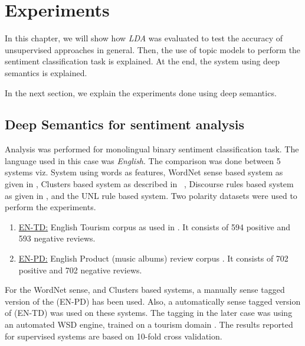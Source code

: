 \chapter{Experiments} %

\label{experiments} %




In this chapter, we will show how \textit{LDA} was evaluated to test the accuracy of unsupervised approaches in general. Then, the use of topic
models to perform the sentiment classification task is explained. At the end, the system using deep semantics is explained.



In the next section, we explain the experiments done using deep semantics.

\section{Deep Semantics for sentiment analysis}

Analysis was performed for monolingual binary sentiment classification task. The language used in this case was \textit{English}. The comparison was done between 5 systems 
viz. System using words as features, WordNet sense based system as given in \citep*{balamurali2011harnessing}, Clusters based system as described in ~\citep*{arhaves}, 
Discourse rules based system as given in \citep*{mukherjee2012sentiment}, and the UNL rule based system. Two polarity datasets were used to perform the experiments. 
    
\begin{enumerate}
  \item \underline{EN-TD:} English Tourism corpus as used in \citep*{ye2009sentiment}. It consists of 594 positive and 593 negative reviews.
  \item \underline{EN-PD:} English Product (music albums) review corpus \citep*{blitzer2007biographies}. It consists of 702 positive and 702 negative 
  reviews. 
\end{enumerate}
   
For the WordNet sense, and Clusters based systems, a manually sense tagged version of the (EN-PD) has been used. Also, a automatically sense tagged version of 
(EN-TD) was used on these systems. The tagging in the later case was using an automated WSD engine, trained on a tourism domain \citep*{balamurali2013lost}.
The results reported for supervised systems are based on 10-fold cross validation.
   
